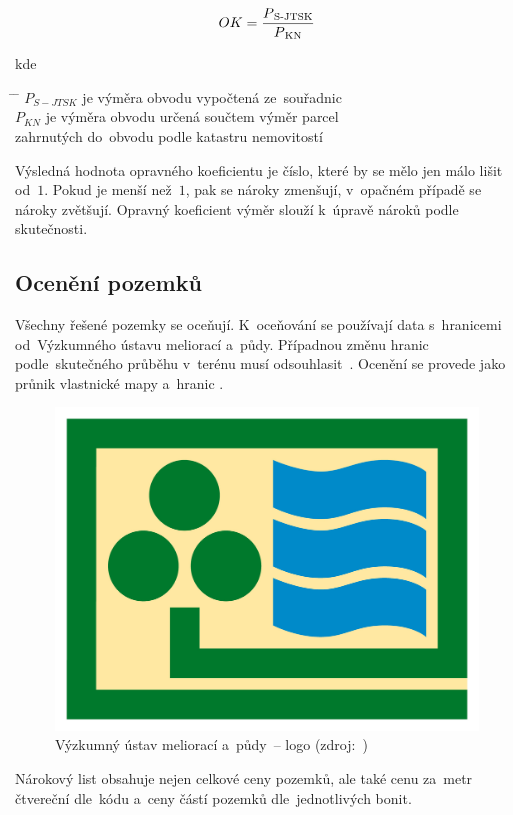 \begin{equation} OK =
\frac{P\textsubscript{S-JTSK}}{P\textsubscript{KN}}
\end{equation}

kde
\begin{tabbing} \hspace{2em} \= \hspace{5em} \= \kill \> $P_{S-JTSK}$
\> je výměra obvodu vypočtená ze~souřadnic \\ \> $P_{KN}$ \> je výměra
obvodu určená součtem výměr parcel \\ \> \> zahrnutých do~obvodu podle
katastru nemovitostí
\end{tabbing}

Výsledná hodnota opravného koeficientu je číslo, které by se mělo jen
málo lišit od~$1$. Pokud je  menší než~$1$, pak se nároky
zmenšují, v~opačném případě se nároky zvětšují. Opravný koeficient
výměr slouží k~úpravě nároků podle skutečnosti.

\subsection{Ocenění pozemků}
\label{oceneni}

Všechny řešené pozemky se oceňují. K~oceňování se používají data
s~hranicemi  od~Výzkumného ústavu meliorací a~půdy. Případnou
změnu hranic  podle~skutečného průběhu v~terénu musí
odsouhlasit~. Ocenění se provede jako průnik vlastnické mapy
a~hranic .

	\begin{figure}[H] \centering
		\includegraphics[width=.5\textwidth]{./pictures/vumop.png}
		\caption[Výzkumný ústav meliorací a~půdy~–
logo]{Výzkumný ústav meliorací a~půdy~– logo (zdroj:~\citep{vumop})}
		\label{fig:vumop}
 	\end{figure}

Nárokový list obsahuje nejen celkové ceny pozemků, ale také cenu
za~metr čtvereční dle~kódu  a~ceny částí pozemků
dle~jednotlivých bonit.

